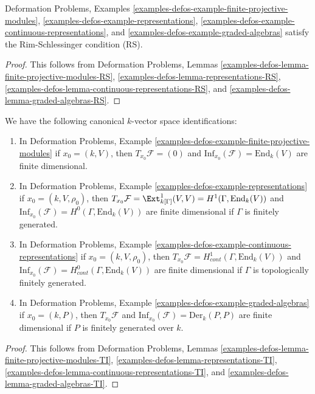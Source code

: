\begin{lemma}
\label{lemma-examples-have-RS}
Deformation Problems, Examples
\ref{examples-defos-example-finite-projective-modules},
\ref{examples-defos-example-representations},
\ref{examples-defos-example-continuous-representations}, and
\ref{examples-defos-example-graded-algebras}
satisfy the Rim-Schlessinger condition (RS).
\end{lemma}

\begin{proof}
This follows from Deformation Problems, Lemmas
\ref{examples-defos-lemma-finite-projective-modules-RS},
\ref{examples-defos-lemma-representations-RS},
\ref{examples-defos-lemma-continuous-representations-RS}, and
\ref{examples-defos-lemma-graded-algebras-RS}.
\end{proof}

\begin{lemma}
\label{lemma-tangent-and-inf}
We have the following canonical $k$-vector space identifications:
\begin{enumerate}
\item In Deformation Problems, Example
\ref{examples-defos-example-finite-projective-modules}
if $x_0 = (k, V)$, then $T_{x_0}\mathcal{F} = (0)$
and $\text{Inf}_{x_0}(\mathcal{F}) = \text{End}_k(V)$
are finite dimensional.
\item In Deformation Problems, Example
\ref{examples-defos-example-representations}
if $x_0 = (k, V, \rho_0)$, then
$T_{x_0}\mathcal{F} = \Ext^1_{k[\Gamma]}(V, V) = H^1(\Gamma, \text{End}_k(V))$
and $\text{Inf}_{x_0}(\mathcal{F}) = H^0(\Gamma, \text{End}_k(V))$
are finite dimensional if $\Gamma$ is finitely generated.
\item In Deformation Problems, Example
\ref{examples-defos-example-continuous-representations}
if $x_0 = (k, V, \rho_0)$, then
$T_{x_0}\mathcal{F} = H^1_{cont}(\Gamma, \text{End}_k(V))$
and
$\text{Inf}_{x_0}(\mathcal{F}) = H^0_{cont}(\Gamma, \text{End}_k(V))$
are finite dimensional if $\Gamma$ is topologically finitely generated.
\item In Deformation Problems, Example
\ref{examples-defos-example-graded-algebras}
if $x_0 = (k, P)$, then
$T_{x_0}\mathcal{F}$ and $\text{Inf}_{x_0}(\mathcal{F}) = \text{Der}_k(P, P)$
are finite dimensional if $P$ is finitely generated over $k$.
\end{enumerate}
\end{lemma}

\begin{proof}
This follows from Deformation Problems, Lemmas
\ref{examples-defos-lemma-finite-projective-modules-TI},
\ref{examples-defos-lemma-representations-TI},
\ref{examples-defos-lemma-continuous-representations-TI}, and
\ref{examples-defos-lemma-graded-algebras-TI}.
\end{proof}












